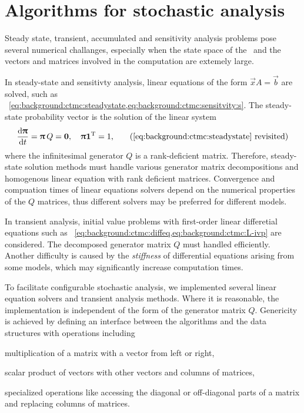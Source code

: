 \chapter{Algorithms for stochastic analysis}
\label{chap:algorithm}

Steady state, transient, accumulated and sensitivity analysis problems
pose several numerical challanges, especially when the state space of
the \CTMC\ and the vectors and matrices involved in the computation are
extemely large.

In steady-state and sensitivty analysis, linear equations of the form
$\vec{x} A = \vec{b}$ are solved, such as%
~\vref{eq:background:ctmc:steadystate,eq:background:ctmc:sensitvity:s}. The
steady-state probability vector is the solution of the linear system
\begin{equation}
  \frac{\dd \vec{\uppi}}{\dd t} = \vec{\uppi} \, Q = \vec{0},
  \quad \vec{\uppi} \vec{1}^\T = 1 \text,
  \tag{\ref{eq:background:ctmc:steadystate}~revisited}
\end{equation}
where the infinitesimal generator $Q$ is a rank-deficient
matrix. Therefore, steady-state solution methods must handle various
generator matrix decompositions and homogenous linear equation with
rank deficient matrices. Convergence and compuation times of linear
equations solvers depend on the numerical properties of the $Q$
matrices, thus different solvers may be preferred for different
models.

In transient analysis, initial value problems with first-order linear
differetial equations such as%
~\vref{eq:background:ctmc:diffeq,eq:background:ctmc:L-ivp} are
considered. The decomposed generator matrix $Q$ must handled
efficiently. Another difficulty is caused by the \emph{stiffness} of
differential equations arising from some models, which may
significantly increase computation times.

To facilitate configurable stochastic analysis, we implemented several
linear equation solvers and transient analysis methods. Where it is
reasonable, the implementation is independent of the form of the
generator matrix $Q$. Genericity is achieved by defining an interface
between the algorithms and the data structures with operations including
\begin{asparaitem}
\item multiplication of a matrix with a vector from left or right,
\item scalar product of vectors with other vectors and columns of
  matrices,
\item specialized operations like accessing the diagonal or
  off-diagonal parts of a matrix and replacing columns of matrices.
\end{asparaitem}

